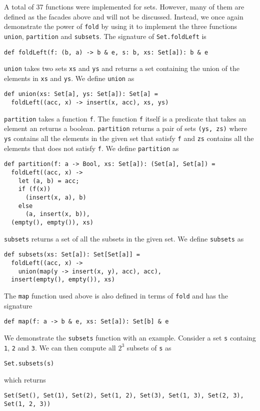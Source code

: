 \documentclass[../main.tex]{subfiles}
\begin{document}
A total of 37 functions were implemented for sets. However, many of them are defined as the facades above and will not be discussed. Instead, we once again demonstrate the power of \lstinline{fold} by using it to implement the three functions \lstinline{union}, \lstinline{partition} and \lstinline{subsets}. The signature of \lstinline{Set.foldLeft} is 
\begin{lstlisting}[language=Flix]
def foldLeft(f: (b, a) -> b & e, s: b, xs: Set[a]): b & e
\end{lstlisting}

\lstinline{union} takes two sets \lstinline{xs} and \lstinline{ys} and returns a set containing the union of the elements in \lstinline{xs} and \lstinline{ys}. We define \lstinline{union} as
\begin{lstlisting}[language=Flix]
def union(xs: Set[a], ys: Set[a]): Set[a] =
  foldLeft((acc, x) -> insert(x, acc), xs, ys)
\end{lstlisting}

\lstinline{partition} takes a function \lstinline{f}. The function \lstinline{f} itself is a predicate that takes an element an returns a boolean. \lstinline{partition} returns a pair of sets \lstinline{(ys, zs)} where \lstinline{ys} contains all the elements in the given set that satisfy \lstinline{f} and \lstinline{zs} contains all the elements that does not satisfy \lstinline{f}. We define \lstinline{partition} as
\begin{lstlisting}[language=Flix]
def partition(f: a -> Bool, xs: Set[a]): (Set[a], Set[a]) =
  foldLeft((acc, x) ->
    let (a, b) = acc;
    if (f(x))
      (insert(x, a), b)
    else
      (a, insert(x, b)),
  (empty(), empty()), xs)
\end{lstlisting}

\lstinline{subsets} returns a set of all the subsets in the given set. We define \lstinline{subsets} as
\begin{lstlisting}[language=Flix]
def subsets(xs: Set[a]): Set[Set[a]] =
  foldLeft((acc, x) ->
    union(map(y -> insert(x, y), acc), acc),
  insert(empty(), empty()), xs)
\end{lstlisting}
The \lstinline{map} function used above is also defined in terms of \lstinline{fold} and has the signature
\begin{lstlisting}[language=Flix]
def map(f: a -> b & e, xs: Set[a]): Set[b] & e
\end{lstlisting}
We demonstrate the \lstinline{subsets} function with an example. Consider a set \lstinline{s} containg \lstinline{1}, \lstinline{2} and \lstinline{3}. We can then compute all $2^3$ subsets of \lstinline{s} as
\begin{lstlisting}[language=Flix]
Set.subsets(s)
\end{lstlisting}
which returns
\begin{lstlisting}[language=Flix]
Set(Set(), Set(1), Set(2), Set(1, 2), Set(3), Set(1, 3), Set(2, 3), Set(1, 2, 3))
\end{lstlisting}
\end{document}
